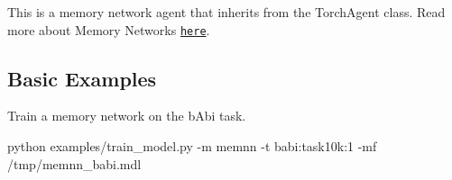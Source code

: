 This is a memory network agent that inherits from the Torch\+Agent class. Read more about Memory Networks \href{https://arxiv.org/abs/1410.3916}{\tt here}.

\subsection*{Basic Examples}

Train a memory network on the b\+Abi task. 
\begin{DoxyCode}
python examples/train\_model.py -m memnn -t babi:task10k:1 -mf /tmp/memnn\_babi.mdl
\end{DoxyCode}
 